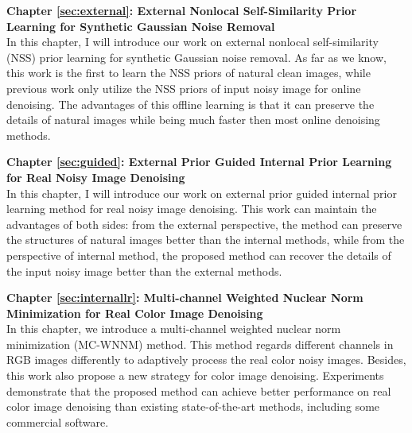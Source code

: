 



\textbf{Chapter \ref{sec:external}: External Nonlocal Self-Similarity Prior Learning for Synthetic Gaussian Noise Removal} \\[0.2em]

In this chapter, I will introduce our work on external nonlocal self-similarity (NSS) prior learning for synthetic Gaussian noise removal. As far as we know, this work is the first to learn the NSS priors of natural clean images, while previous work only utilize the NSS priors of input noisy image for online denoising. The advantages of this offline learning is that it can preserve the details of natural images while being much faster then most online denoising methods.


\textbf{Chapter \ref{sec:guided}: External Prior Guided Internal Prior Learning for Real Noisy Image Denoising} \\[0.2em]

In this chapter, I will introduce our work on external prior guided internal prior learning method for real noisy image denoising. This work can maintain the advantages of both sides: from the external perspective, the method can preserve the structures of natural images better than the internal methods, while from the perspective of internal method, the proposed method can recover the details of the input noisy image better than the external methods.



\textbf{Chapter \ref{sec:internallr}: Multi-channel Weighted Nuclear Norm Minimization for Real Color Image Denoising} \\[0.2em]

In this chapter, we introduce a multi-channel weighted nuclear norm minimization (MC-WNNM) method. This method regards different channels in RGB images differently to adaptively process the real color noisy images. Besides, this work also propose a new strategy for color image denoising. Experiments demonstrate that the proposed method can achieve better performance on real color image denoising than existing state-of-the-art methods, including some commercial software.



